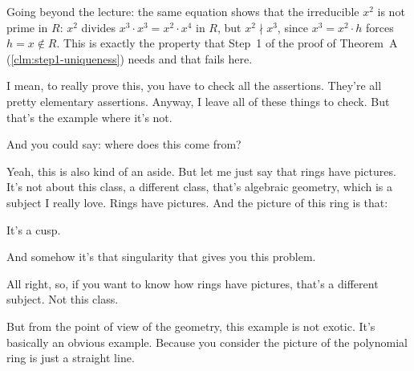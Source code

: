 \begin{content}

\begin{steps}
Going beyond the lecture: the same equation shows that the irreducible $x^2$ is not prime in $R$: $x^2$ divides $x^3 \cdot x^3 = x^2 \cdot x^4$ in $R$, but $x^2 \nmid x^3$, since $x^3 = x^2 \cdot h$ forces $h = x \notin R$. This is exactly the property that Step~1 of the proof of Theorem~A (\cref{clm:step1-uniqueness}) needs and that fails here.
\end{steps}
\end{content}

\begin{speech}[00:27:06 - 00:28:25]
I mean, to really prove this, you have to check all the assertions. They're all pretty elementary assertions. Anyway, I leave all of these things to check. But that's the example where it's not.

And you could say: where does this come from?

Yeah, this is also kind of an aside. But let me just say that rings have pictures. It's not about this class, a different class, that's algebraic geometry, which is a subject I really love. Rings have pictures. And the picture of this ring is that: 

It's a cusp.

And somehow it's that singularity that gives you this problem.

All right, so, if you want to know how rings have pictures, that's a different subject. Not this class. 

But from the point of view of the geometry, this example is not exotic. It's basically an obvious example. Because you consider the picture of the polynomial ring is just a straight line.
\end{speech}

